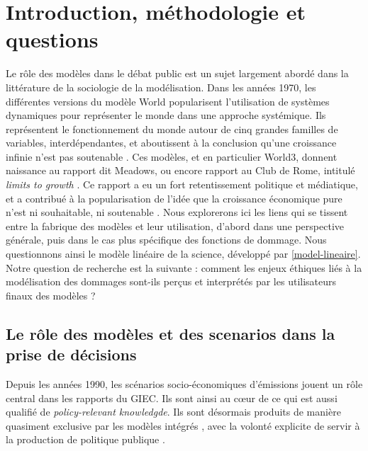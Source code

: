 


\section{Introduction, méthodologie et questions}

Le rôle des modèles dans le débat public est un sujet largement abordé dans la littérature de la sociologie de la modélisation. Dans les années 1970, les différentes versions du modèle World popularisent l'utilisation de systèmes dynamiques pour représenter le monde dans une approche systémique. Ils représentent le fonctionnement du monde autour de cinq grandes familles de variables, interdépendantes, et aboutissent à la conclusion qu'une croissance infinie n'est pas soutenable \cite{forrester_world_1971}.  Ces modèles, et en particulier World3, donnent naissance au rapport dit Meadows, ou encore rapport au Club de Rome, intitulé \emph{limits to growth} \cite{meadows_limits_1972}. Ce rapport a eu un fort retentissement politique et médiatique, et a contribué à la popularisation de l'idée que la croissance économique pure n'est ni souhaitable, ni soutenable \cite{edwards_global_1996}. 
Nous explorerons ici les liens qui se tissent entre la fabrique des modèles et leur utilisation, d'abord dans une perspective générale, puis dans le cas plus spécifique des fonctions de dommage. Nous questionnons ainsi le modèle linéaire de la science, développé par \cite{aykut_gouverner_nodate} \ref{model-lineaire}. Notre question de recherche est la suivante : comment les enjeux éthiques liés à la modélisation des dommages sont-ils perçus et interprétés par les utilisateurs finaux des modèles ? 

\subsection{Le rôle des modèles et des scenarios dans la prise de décisions}

Depuis les années 1990, les scénarios socio-économiques d'émissions jouent un rôle central dans les rapports du GIEC. Ils sont ainsi au cœur de ce qui est aussi qualifié de \emph{policy-relevant knowledgde}. Ils sont désormais produits de manière quasiment exclusive par les modèles intégrés \cite{cointe_organising_2019}, avec la volonté explicite de servir à la production de politique publique \cite{Weyant}. \\



